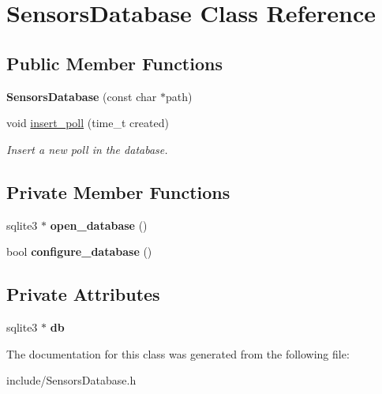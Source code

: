 \hypertarget{classSensorsDatabase}{\section{Sensors\+Database Class Reference}
\label{classSensorsDatabase}
}
\subsection*{Public Member Functions}
\begin{DoxyCompactItemize}
\item 
\hypertarget{classSensorsDatabase_a0f4f373b6b431d393965b96d34271863}{{\bfseries Sensors\+Database} (const char $\ast$path)}\label{classSensorsDatabase_a0f4f373b6b431d393965b96d34271863}

\item 
\hypertarget{classSensorsDatabase_a40a8126a616bd6933d4fabff016d3eb4}{void \hyperlink{classSensorsDatabase_a40a8126a616bd6933d4fabff016d3eb4}{insert\+\_\+poll} (time\+\_\+t created)}\label{classSensorsDatabase_a40a8126a616bd6933d4fabff016d3eb4}

\begin{DoxyCompactList}\small\item\em Insert a new poll in the database. \end{DoxyCompactList}\end{DoxyCompactItemize}
\subsection*{Private Member Functions}
\begin{DoxyCompactItemize}
\item 
\hypertarget{classSensorsDatabase_aa5e16408e6283c1bb307cc0d2ea6ee29}{sqlite3 $\ast$ {\bfseries open\+\_\+database} ()}\label{classSensorsDatabase_aa5e16408e6283c1bb307cc0d2ea6ee29}

\item 
\hypertarget{classSensorsDatabase_a4b57d4c939653a74515e372653065f5f}{bool {\bfseries configure\+\_\+database} ()}\label{classSensorsDatabase_a4b57d4c939653a74515e372653065f5f}

\end{DoxyCompactItemize}
\subsection*{Private Attributes}
\begin{DoxyCompactItemize}
\item 
\hypertarget{classSensorsDatabase_a18cf8a737f550d5028f21c10b26b8ffe}{sqlite3 $\ast$ {\bfseries db}}\label{classSensorsDatabase_a18cf8a737f550d5028f21c10b26b8ffe}

\end{DoxyCompactItemize}


The documentation for this class was generated from the following file\+:\begin{DoxyCompactItemize}
\item 
include/Sensors\+Database.\+h\end{DoxyCompactItemize}
